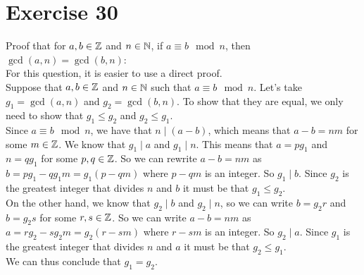 \documentclass[12pt]{article}
\begin{document}
    \section*{Exercise 30}
    Proof that for $a, b \in \mathbb{Z}$ and $n \in \mathbb{N}$,
    if $a \equiv b \mod n$,
    then $\gcd(a, n) = \gcd(b, n)$: \\
    For this question, it is easier to use a direct proof. \\
    Suppose that $a, b \in \mathbb{Z}$ and $n \in \mathbb{N}$
    such that $a \equiv b \mod n$.
    Let's take $g_1 = \gcd(a, n)$ and $g_2 = \gcd(b, n)$.
    To show that they are equal,
    we only need to show that $g_1 \leqslant g_2$
    and $g_2 \leqslant g_1$. \\
    Since $a \equiv b \mod n$,
    we have that $n \mid (a-b)$,
    which means that $a-b = nm$
    for some $m \in \mathbb{Z}$.
    We know that $g_1 \mid a$ and $g_1 \mid n$.
    This means that $a = pg_1$ and $n = qg_1$
    for some $p, q \in \mathbb{Z}$.
    So we can rewrite $a-b = nm$
    as $b = pg_1 - qg_1m = g_1(p - qm)$
    where $p - qm$ is an integer.
    So $g_1 \mid b$.
    Since $g_2$ is the greatest integer that
    divides $n$ and $b$
    it must be that $g_1 \leqslant g_2$. \\
    On the other hand, 
    we know that $g_2 \mid b$ and $g_2 \mid n$,
    so we can write $b = g_2r$ and $b = g_2s$
    for some $r, s \in \mathbb{Z}$. 
    So we can write $a-b = nm$
    as $a = rg_2 - sg_2m = g_2(r - sm)$
    where $r - sm$ is an integer.
    So $g_2 \mid a$.
    Since $g_1$ is the greatest integer that
    divides $n$ and $a$
    it must be that $g_2 \leqslant g_1$. \\
    We can thus conclude that $g_1 = g_2$. \\
\end{document}

